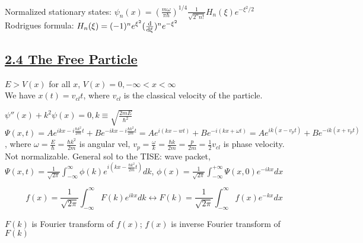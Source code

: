 Normalized stationary states:
$\psi_n(x) = (\frac{m \omega}{\pi \hbar})^{1/4} \frac{1}{\sqrt{2^n n!}} H_n(\xi) e^{-\xi^2 / 2}$ \\

Rodrigues formula: $H_n(\xi) = (-1)^n e^{\xi^2} (\dv{}{\xi})^n e^{-\xi^2}$




\vspace{-0.5em}

\subsection{\underline{2.4 The Free Particle}}
$E > V(x)$ for all $x$, $V(x) = 0, -\infty < x < \infty$ \\

We have $x(t) = v_{cl} t$, where $v_{cl}$ is the classical velocity of the particle.

$\psi''(x) + k^2 \psi(x) = 0, k \equiv \sqrt{\frac{2mE}{\hbar^2}}$ \\
$\Psi(x, t) = Ae^{ikx - i \frac{\hbar k^2}{2m} t} + Be^{-ikx - i \frac{\hbar k^2}{2m} t} = A e^{i(kx - wt)} + Be^{-i(kx + \omega t)} = A e^{ik(x - v_p t)} + Be^{-ik(x + v_{p} t)}$,
where $\omega = \frac{E}{\hbar} = \frac{\hbar k^2}{2m}$ is angular vel, $v_p = \frac{\omega}{k} = \frac{\hbar k }{2m} = \frac{p}{2m} = \frac{1}{2} v_{cl}$ is phase velocity. \\

Not normalizable. General sol to the TISE: wave packet, 
\tiny
$\Psi(x, t) = \frac{1}{\sqrt{2\pi}} \int_{-\infty}^{\infty} \phi(k) e^{i (kx - \frac{\hbar k^2}{2m} t)} dk$,
$\phi(x) = \frac{1}{\sqrt{2 \pi}} \int_{-\infty}^{+\infty} \Psi(x, 0) e^{-ikx} dx$
\scriptsize

$$f(x) = \frac{1}{\sqrt{2 \pi}} \int_{-\infty}^{\infty} F(k) e^{ikx} dk \leftrightarrow F(k) = \frac{1}{\sqrt{2\pi}} \int_{-\infty}^{\infty} f(x) e^{-kx} dx$$

$F(k)$ is Fourier transform of $f(x)$; $f(x)$ is inverse Fourier transform of $F(k)$ \\

